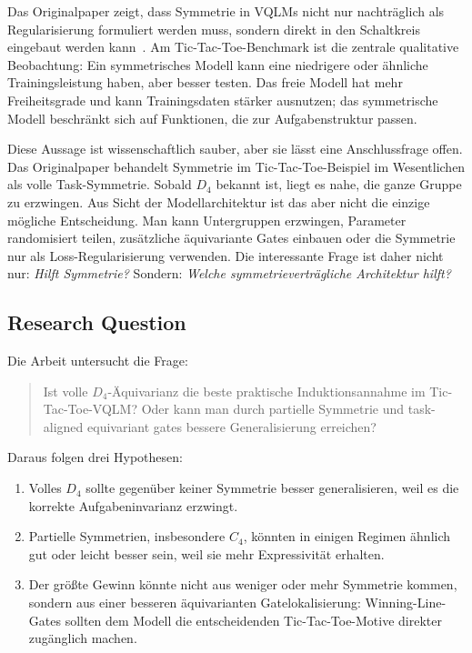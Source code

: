 Das Originalpaper zeigt, dass Symmetrie in VQLMs nicht nur nachträglich als Regularisierung formuliert werden muss, sondern direkt in den Schaltkreis eingebaut werden kann~\cite{meyer2022exploiting}. Am Tic-Tac-Toe-Benchmark ist die zentrale qualitative Beobachtung: Ein symmetrisches Modell kann eine niedrigere oder ähnliche Trainingsleistung haben, aber besser testen. Das freie Modell hat mehr Freiheitsgrade und kann Trainingsdaten stärker ausnutzen; das symmetrische Modell beschränkt sich auf Funktionen, die zur Aufgabenstruktur passen.

Diese Aussage ist wissenschaftlich sauber, aber sie lässt eine Anschlussfrage offen. Das Originalpaper behandelt Symmetrie im Tic-Tac-Toe-Beispiel im Wesentlichen als volle Task-Symmetrie. Sobald $D_4$ bekannt ist, liegt es nahe, die ganze Gruppe zu erzwingen. Aus Sicht der Modellarchitektur ist das aber nicht die einzige mögliche Entscheidung. Man kann Untergruppen erzwingen, Parameter randomisiert teilen, zusätzliche äquivariante Gates einbauen oder die Symmetrie nur als Loss-Regularisierung verwenden. Die interessante Frage ist daher nicht nur: \emph{Hilft Symmetrie?} Sondern: \emph{Welche symmetrieverträgliche Architektur hilft?}

\subsection{Research Question}\label{subsec:rq}

Die Arbeit untersucht die Frage:
\begin{quote}\small
Ist volle $D_4$-Äquivarianz die beste praktische Induktionsannahme im Tic-Tac-Toe-VQLM? Oder kann man durch partielle Symmetrie und task-aligned equivariant gates bessere Generalisierung erreichen?
\end{quote}

Daraus folgen drei Hypothesen:
\begin{enumerate}
\item Volles $D_4$ sollte gegenüber keiner Symmetrie besser generalisieren, weil es die korrekte Aufgabeninvarianz erzwingt.
\item Partielle Symmetrien, insbesondere $C_4$, könnten in einigen Regimen ähnlich gut oder leicht besser sein, weil sie mehr Expressivität erhalten.
\item Der größte Gewinn könnte nicht aus weniger oder mehr Symmetrie kommen, sondern aus einer besseren äquivarianten Gatelokalisierung: Winning-Line-Gates sollten dem Modell die entscheidenden Tic-Tac-Toe-Motive direkter zugänglich machen.
\end{enumerate}

